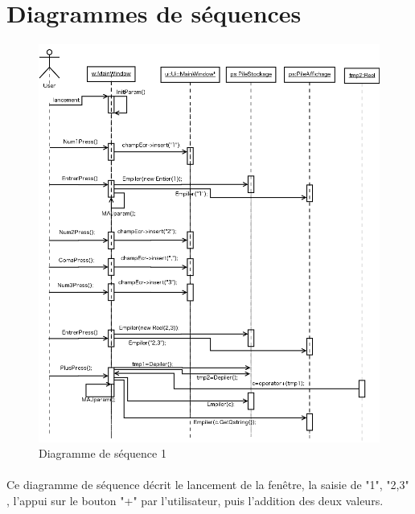 \documentclass[a4paper,12pt]{report}
\begin{document}
	\section{Diagrammes de séquences}
		\begin{figure}[H]
			\center
			\includegraphics[width=16cm]{diag_seq_1.png}
			\caption{Diagramme de séquence 1}
			\label{Diagramme sequence 1}
		\end{figure}
		
		\paragraph{}Ce diagramme de séquence décrit le lancement de la fenêtre, la saisie de "1", "2,3" , l'appui sur le bouton "+" par l'utilisateur, puis l'addition des deux valeurs.
\end{document}
